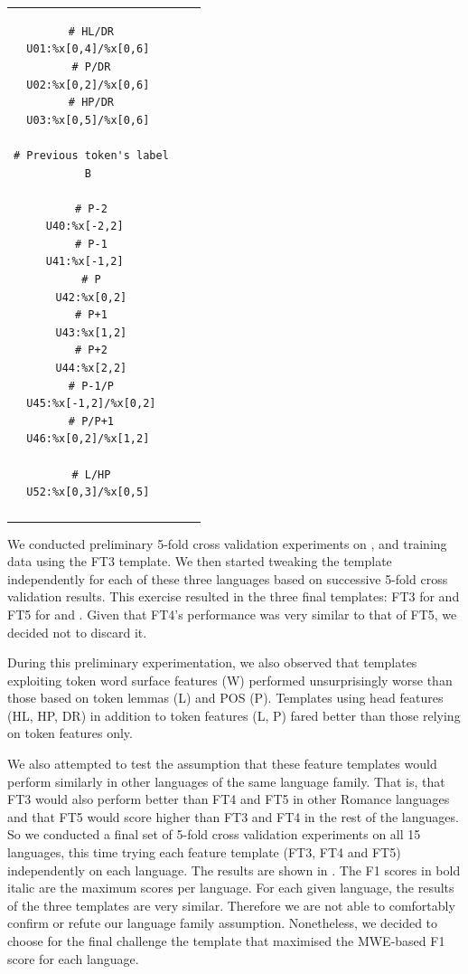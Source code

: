\documentclass[output=paper
,modfonts
,nonflat]{langsci/langscibook}
\begin{document}
\begin{table}
{\begin{tabular}{ccc}
\begin{minipage}[t]{3.6cm}
\begin{verbatim}
# HL/DR
U01:%x[0,4]/%x[0,6] 
# P/DR
U02:%x[0,2]/%x[0,6] 
# HP/DR
U03:%x[0,5]/%x[0,6] 

# Previous token's label
B 

# P-2
U40:%x[-2,2]  
# P-1
U41:%x[-1,2]  
# P
U42:%x[0,2]
# P+1
U43:%x[1,2]
# P+2
U44:%x[2,2]
# P-1/P
U45:%x[-1,2]/%x[0,2]
# P/P+1
U46:%x[0,2]/%x[1,2] 

# L/HP
U52:%x[0,3]/%x[0,5] 
\end{verbatim}
\end{minipage}\\
\lspbottomrule
  \end{tabular}
} 
\end{table}

We conducted preliminary 5-fold cross validation experiments on ,  and
 training data using the FT3 template. We then started tweaking the template independently for each of these three languages based on successive 5-fold cross validation results. This exercise resulted in the three final templates: FT3 for  and FT5 for  and . Given that FT4's performance was very similar to that of FT5, we decided not to discard it. 

During this preliminary experimentation, we also observed that templates exploiting token
word surface features (W) performed unsurprisingly worse than those
based on token lemmas (L) and POS (P). Templates using head features
(HL, HP, DR) in addition to token features (L, P) fared better than
those relying on token features only. 

We also attempted to test the assumption that these feature templates would perform similarly in other languages of the same language family. That is, that FT3 would also perform better than FT4 and FT5 in other Romance languages and that FT5 would score higher than FT3 and FT4 in the rest of the languages. So we conducted a final set of 5-fold cross validation experiments on all 15 languages, this time trying each feature template (FT3, FT4 and FT5) independently on each language. The results are shown in . The F1 scores in bold italic are the maximum scores per language. For each given language, the results of the three templates are very similar. Therefore we are not able to comfortably confirm or refute our language family assumption. Nonetheless, we decided to choose for the final challenge the template that maximised the MWE-based F1 score for each language.
\end{document}
